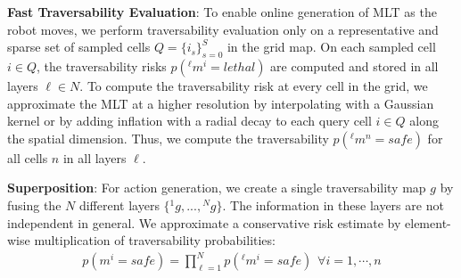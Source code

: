 \documentclass[letterpaper, 10pt, conference]{ieeeconf}      %
\newcommand{\ph}[1]{{\textbf{#1}:}} %
\newcommand{\rev}[1]{{\color{blue}#1}} %
\begin{document}
\ph{Fast Traversability Evaluation}
To enable online generation of MLT as the robot moves, we perform traversability evaluation only on a representative and sparse set of sampled cells $Q = \{i_s\}_{s=0}^S$ in the grid map. %
On each sampled cell $i\in Q$, the traversability risks $p({}^{\ell}m^{i}=lethal)$ are computed and stored in all layers $\ell \in N$. To compute the traversability risk at every cell in the grid, %
we approximate the MLT at a higher resolution by interpolating with a Gaussian kernel or by adding inflation with a radial decay to each query cell $i \in Q$ along the spatial dimension.
Thus, we compute the traversability $p({}^{\ell}m^{n}=safe)$ for all cells $n$ in all layers $\ell$.



\ph{Superposition}
For action generation, we create a single traversability map $g$ by fusing the $N$ different layers $\{{}^{1}g,...,{}^{N}g\}$. %
The information in these layers are not independent in general. We approximate a conservative risk estimate by element-wise multiplication of traversability probabilities:
\begin{align}
p(m^i=safe) = \prod_{\ell=1}^Np({}^{\ell}m^{i}=safe)\hspace{5pt} \forall i = 1,\cdots,n
\end{align}
\end{document}
